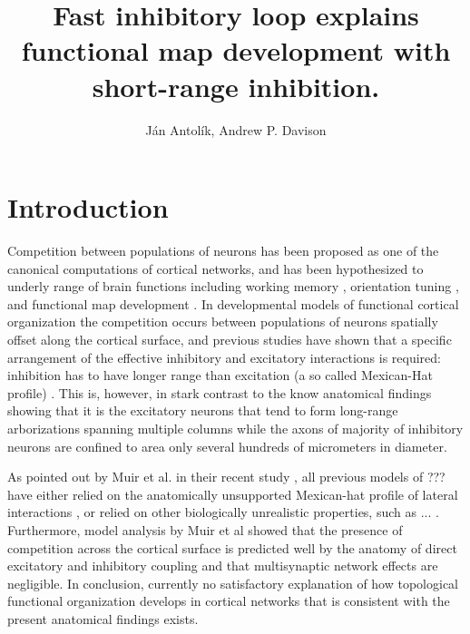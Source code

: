 \documentclass[a4paper,10pt]{article}
\title{Fast inhibitory loop explains functional map development with short-range inhibition.}
\author{J\'an Antol\'ik, Andrew P. Davison}
\begin{document}
 \maketitle
{}


\section{Introduction}

Competition between populations of neurons has been proposed as one of the canonical computations of cortical 
networks, and has been hypothesized to underly range of brain functions including working memory \cite{Amit1995,Durstewitz2000},
orientation tuning \cite{Somers1995,Ben-Yishai1995}, and functional map development \cite{VonderMalsburg1973,Antolik2011}.
In developmental models of functional cortical organization the competition occurs between populations of neurons spatially offset 
along the cortical surface, and previous studies have shown that a specific arrangement of the effective inhibitory and excitatory 
interactions is required: inhibition has to have longer range than excitation (a so called Mexican-Hat profile) \cite{Muir2014,?}.
This is, however, in stark contrast to the know anatomical findings showing that it is the excitatory neurons that tend to form 
long-range arborizations spanning multiple columns while the axons of majority of inhibitory neurons are confined to area
only several hundreds of micrometers in diameter.


As pointed out by Muir et al. in their recent study \cite{Muir2014}, all previous models of ??? have either relied on the anatomically 
unsupported Mexican-hat profile of lateral interactions \cite{?,?}, or relied on other biologically unrealistic properties, such as  ... .
Furthermore, model analysis by Muir et al \cite{Muir2014} showed that the presence of competition across the cortical surface 
is predicted well by the anatomy of direct excitatory and inhibitory coupling and that multisynaptic network effects are negligible.	
In conclusion, currently no satisfactory explanation of how topological functional organization develops in cortical networks 
that is consistent with the present anatomical findings exists. 
\end{document}
